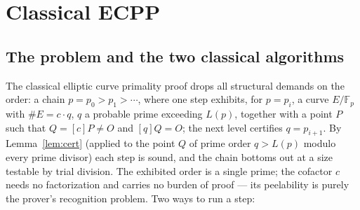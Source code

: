 \documentclass[11pt]{amsart}
\newcommand{\F}{\mathbb{F}}
\theoremstyle{plain}
\theoremstyle{definition}
\theoremstyle{remark}
\begin{document}
\section{Classical ECPP}\label{sec:ecpp}

\subsection{The problem and the two classical algorithms}\label{sec:ecppalgs}

The classical elliptic curve primality proof drops all structural demands on the order: a chain
$p = p_0 > p_1 > \cdots$, where one step exhibits, for $p = p_i$, a curve $E/\F_p$ with
$\#E = c\cdot q$, $q$ a probable prime exceeding $L(p)$, together with a point $P$ such that
$Q = [c]P \ne O$ and $[q]Q = O$; the next level certifies $q = p_{i+1}$.  By Lemma~\ref{lem:cert}
(applied to the point $Q$ of prime order $q > L(p)$ modulo every prime divisor) each step is sound, and
the chain bottoms out at a size testable by trial division.  The exhibited order is a single prime; the
cofactor $c$ needs no factorization and carries no burden of proof --- its peelability is purely the
prover's recognition problem.  Two ways to run a step:
\end{document}
